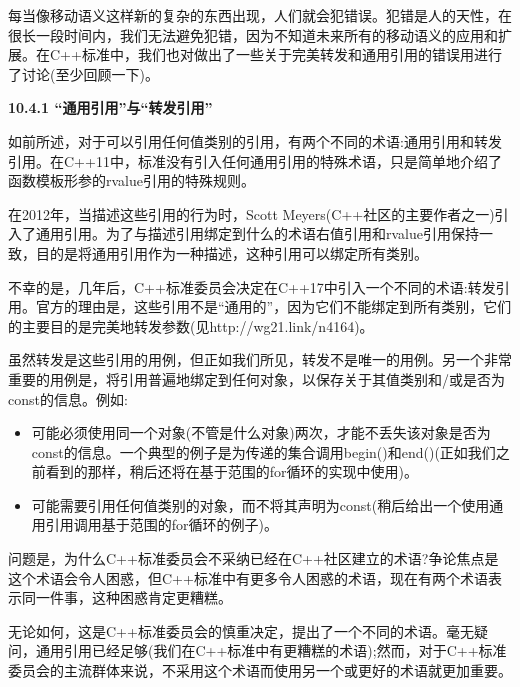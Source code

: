 每当像移动语义这样新的复杂的东西出现，人们就会犯错误。犯错是人的天性，在很长一段时间内，我们无法避免犯错，因为不知道未来所有的移动语义的应用和扩展。在C++标准中，我们也对做出了一些关于完美转发和通用引用的错误用进行了讨论(至少回顾一下)。\par

\hspace*{\fill} \par %
\textbf{10.4.1 “通用引用”与“转发引用”}

如前所述，对于可以引用任何值类别的引用，有两个不同的术语:通用引用和转发引用。在C++11中，标准没有引入任何通用引用的特殊术语，只是简单地介绍了函数模板形参的rvalue引用的特殊规则。\par

在2012年，当描述这些引用的行为时，Scott Meyers(C++社区的主要作者之一)引入了通用引用。为了与描述引用绑定到什么的术语右值引用和rvalue引用保持一致，目的是将通用引用作为一种描述，这种引用可以绑定所有类别。\par

不幸的是，几年后，C++标准委员会决定在C++17中引入一个不同的术语:转发引用。官方的理由是，这些引用不是“通用的”，因为它们不能绑定到所有类别，它们的主要目的是完美地转发参数(见http://wg21.link/n4164)。\par

虽然转发是这些引用的用例，但正如我们所见，转发不是唯一的用例。另一个非常重要的用例是，将引用普遍地绑定到任何对象，以保存关于其值类别和/或是否为const的信息。例如:\par

\begin{itemize}
	\item 可能必须使用同一个对象(不管是什么对象)两次，才能不丢失该对象是否为const的信息。一个典型的例子是为传递的集合调用begin()和end()(正如我们之前看到的那样，稍后还将在基于范围的for循环的实现中使用)。
	\item 可能需要引用任何值类别的对象，而不将其声明为const(稍后给出一个使用通用引用调用基于范围的for循环的例子)。
\end{itemize}

问题是，为什么C++标准委员会不采纳已经在C++社区建立的术语?争论焦点是这个术语会令人困惑，但C++标准中有更多令人困惑的术语，现在有两个术语表示同一件事，这种困惑肯定更糟糕。\par

无论如何，这是C++标准委员会的慎重决定，提出了一个不同的术语。毫无疑问，通用引用已经足够(我们在C++标准中有更糟糕的术语);然而，对于C++标准委员会的主流群体来说，不采用这个术语而使用另一个或更好的术语就更加重要。\par

